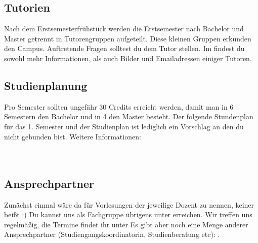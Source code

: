 \begin{multicols}{2}
\subsection*{Tutorien}
Nach dem Erstsemesterfrühstück werden die Erstsemester nach Bachelor und
Master getrennt in Tutorengruppen aufgeteilt. Diese kleinen Gruppen erkunden den Campus. Auftretende Fragen solltest du dem Tutor stellen. Im 
 findest du sowohl mehr Informationen, als auch Bilder und Emailadressen
einiger Tutoren.%
\subsection*{Studienplanung}
Pro Semester sollten ungefähr 30 Credits erreicht werden, damit man in
6 Semestern den Bachelor und in 4 den Master besteht.
Der folgende Stundenplan für das 1. Semester und der Studienplan ist lediglich ein Vorschlag an den du nicht gebunden bist. Weitere Informationen:\\
\\
\\
\subsection*{Ansprechpartner}
Zunächst einmal wäre da für Vorlesungen der jeweilige Dozent zu nennen,
keiner beißt :) Du kannst uns als Fachgruppe übrigens unter
  erreichen. Wir treffen uns regelmäßig,
die Termine findet ihr unter
Es gibt aber noch eine Menge anderer Ansprechpartner
(Studiengangskoordinatorin, Studienberatung etc):
. 


\end{multicols}
